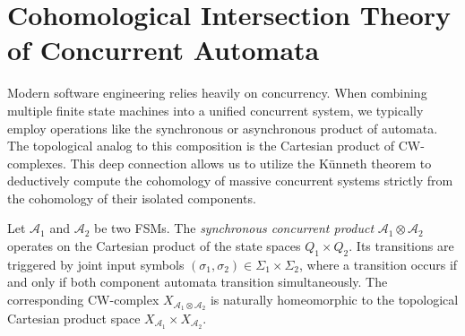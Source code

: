 \section{Cohomological Intersection Theory of Concurrent Automata}

Modern software engineering relies heavily on concurrency. When combining multiple finite state machines into a unified concurrent system, we typically employ operations like the synchronous or asynchronous product of automata. The topological analog to this composition is the Cartesian product of CW-complexes. This deep connection allows us to utilize the Künneth theorem to deductively compute the cohomology of massive concurrent systems strictly from the cohomology of their isolated components.

\begin{definition}
Let $\mathcal{A}_1$ and $\mathcal{A}_2$ be two FSMs. The \emph{synchronous concurrent product} $\mathcal{A}_1 \otimes \mathcal{A}_2$ operates on the Cartesian product of the state spaces $Q_1 \times Q_2$. Its transitions are triggered by joint input symbols $(\sigma_1, \sigma_2) \in \Sigma_1 \times \Sigma_2$, where a transition occurs if and only if both component automata transition simultaneously. The corresponding CW-complex $X_{\mathcal{A}_1 \otimes \mathcal{A}_2}$ is naturally homeomorphic to the topological Cartesian product space $X_{\mathcal{A}_1} \times X_{\mathcal{A}_2}$.
\end{definition}

